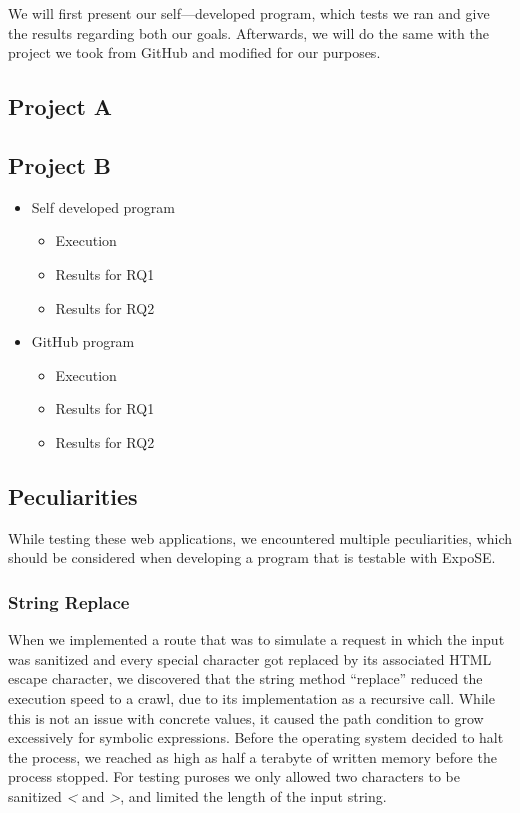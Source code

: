 We will first present our self—developed program, which tests we ran and give the results regarding both our goals. Afterwards, we will do the same with the project we took from GitHub and modified for our purposes.



\subsection{Project A}





\subsection{Project B}

\begin{itemize}
    \item Self developed program
    \begin{itemize}
        \item Execution
        \item Results for RQ1
        \item Results for RQ2
    \end{itemize}
    \item GitHub program
    \begin{itemize}
        \item Execution
        \item Results for RQ1
        \item Results for RQ2
    \end{itemize}
\end{itemize}

\subsection{Peculiarities}
\label{sec:peculiarities}
While testing these web applications, we encountered multiple peculiarities, which should be considered when developing a program that is testable with ExpoSE.

\subsubsection{String Replace}
When we implemented a route that was to simulate a request in which the input was sanitized and every special character got replaced by its associated HTML escape character, we discovered that the string method “replace” reduced the execution speed to a crawl, due to its implementation as a recursive call.
While this is not an issue with concrete values, it caused the path condition to grow excessively for symbolic expressions. Before the operating system decided to halt the process, we reached as high as half a terabyte of written memory before the process stopped. For testing puroses we only allowed two
characters to be sanitized \textit{\textless} and \textit{\textgreater}, and limited the length of the input string. 



